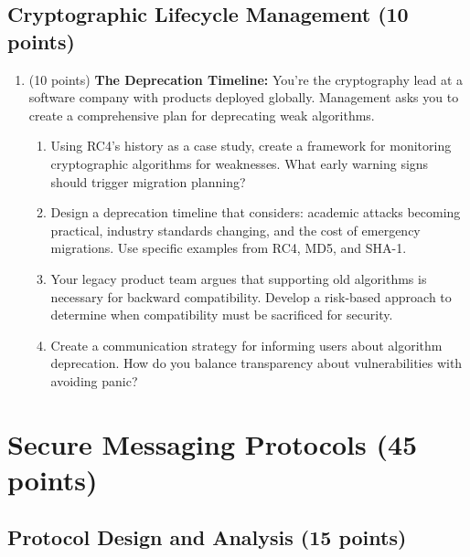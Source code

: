 \documentclass[10pt,a4paper,american]{article}
\begin{document}
\subsection{Cryptographic Lifecycle Management (10 points)}

\begin{enumerate}
	\item (10 points) \textbf{The Deprecation Timeline:}
	      You're the cryptography lead at a software company with products deployed globally. Management asks you to create a comprehensive plan for deprecating weak algorithms.
	      \begin{enumerate}
		      \item Using RC4's history as a case study, create a framework for monitoring cryptographic algorithms for weaknesses. What early warning signs should trigger migration planning?
		      \item Design a deprecation timeline that considers: academic attacks becoming practical, industry standards changing, and the cost of emergency migrations. Use specific examples from RC4, MD5, and SHA-1.
		      \item Your legacy product team argues that supporting old algorithms is necessary for backward compatibility. Develop a risk-based approach to determine when compatibility must be sacrificed for security.
		      \item Create a communication strategy for informing users about algorithm deprecation. How do you balance transparency about vulnerabilities with avoiding panic?
	      \end{enumerate}
\end{enumerate}

\section{Secure Messaging Protocols (45 points)}

\subsection{Protocol Design and Analysis (15 points)}
\end{document}
